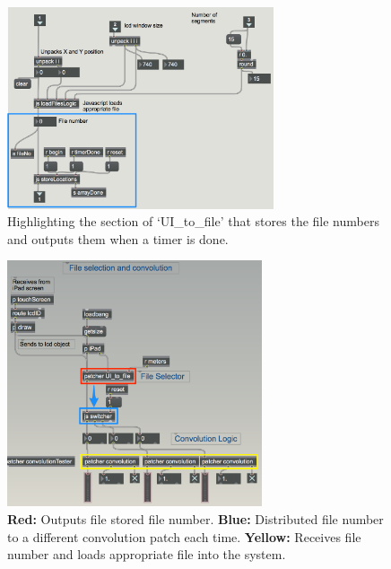 \documentclass[../../main.tex]{subfiles}
\begin{document}
			\begin{figure}[p]
				\centerline{\includegraphics[width=0.7\textwidth]{Sections/Implementation/Max/images/Max/Iteration3/storeLocations_edit2.png}}
				\caption{Highlighting the section of `UI\_to\_file' that stores the file numbers and outputs them when a timer is done.}
				\label{storeLocations}
			\end{figure}

			\begin{figure}[p]
				\centerline{\includegraphics[width=0.67\textwidth]{Sections/Implementation/Max/images/Max/Iteration3/fileSelectionConvolution_Edit.png}}
				\caption{\textbf{Red:} Outputs file stored file number. \textbf{Blue:} Distributed file number to a different convolution patch each time. \textbf{Yellow:} Receives file number and loads appropriate file into the system.}
				\label{overviewIteration3}
			\end{figure}
\end{document}
